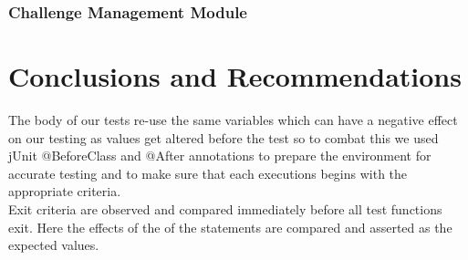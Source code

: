 \documentclass[english]{article}
\begin{document}
	\subsubsection{Challenge Management Module}
		\section{Conclusions and Recommendations}
		The body of our tests re-use the same variables which can have a negative effect on our testing as values get altered before the test so to combat this we used jUnit @BeforeClass and @After annotations to prepare the environment for accurate testing and to make sure that each executions begins with the appropriate criteria.
		\\[4pt]
		Exit criteria are observed and compared immediately before all test functions exit. Here the effects of the of the statements are compared and asserted as the expected values.
		
\end{document}
